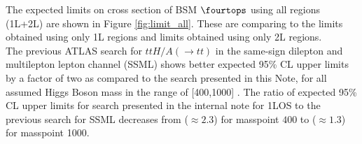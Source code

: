 %
The expected limits on cross section of BSM $\fourtops$ using all regions (1L+2L) are shown in Figure \ref{fig:limit_all}. These are comparing to the limits obtained using only 1L regions and limits obtained using only 2L regions. \\
The previous ATLAS search for $ttH/A(\rightarrow tt)$ in the same-sign dilepton and multilepton lepton channel (SSML) shows better expected 95\% CL upper limits by a factor of two as compared to the search presented in this Note, for all assumed Higgs Boson mass in the range of [400,1000] \cite{Aad:2020klt}. The ratio of expected 95\% CL upper limits for search presented in the internal note for 1LOS to the previous search for SSML decreases from ($\approx 2.3$) for masspoint $400$ to ($\approx 1.3$) for masspoint 1000.





